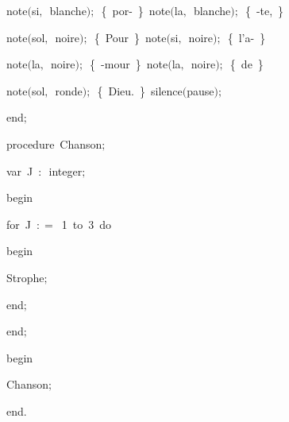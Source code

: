 {\vspace{\neglskip}\mbox{\blc  \blk\blk\idt  note$($si$,$\ blanche$)$$;$\ \cmt  \{\ por-\ \}\idt \ note$($la$,$\ blanche$)$$;$\ \cmt  \{\ -te,\ \}\idt }\par 
\vspace{\neglskip}\mbox{\blc  \blk\blk\idt  note$($sol$,$\ noire$)$$;$\ \cmt  \{\ Pour\ \}\idt \ note$($si$,$\ noire$)$$;$\ \cmt  \{\ l{'}a-\ \}\idt }\par 
\vspace{\neglskip}\mbox{\blc  \blk\blk\idt  note$($la$,$\ noire$)$$;$\ \cmt  \{\ -mour\ \}\idt \ note$($la$,$\ noire$)$$;$\ \cmt  \{\ de\ \}\idt }\par 
\vspace{\neglskip}\mbox{\blc  \blk\blk\idt  note$($sol$,$\ ronde$)$$;$\ \cmt  \{\ Dieu.\ \}\idt \ silence$($pause$)$$;$}\par 
\vspace{\neglskip}\mbox{\blc  \blk\idt  \mcl end\idt $;$}\par 
\medskip

\pagebreak[3] 
\vspace{\neglskip}\mbox{\blc  \blk\idt  \mcl procedure\idt \ Chanson$;$}\par 
\pagebreak[3] 
\vspace{\neglskip}\mbox{\blc  \blk\blk\idt  \mcl var\idt \ J\ $:$\ integer$;$}\par 
\vspace{\neglskip}\mbox{\blc  \blk\idt  \mcl begin\idt }\par 
\pagebreak[3] 
\vspace{\neglskip}\mbox{\blc  \blk\blk\idt  \mcl for\idt \ J\ $:$$=$\ 1\ \mcl to\idt \ 3\ \mcl do\idt }\par 
\vspace{\neglskip}\mbox{\blc  \blk\blk\blk\idt  \mcl begin\idt }\par 
\vspace{\neglskip}\mbox{\blc  \blk\blk\blk\blk\idt  Strophe$;$}\par 
\vspace{\neglskip}\mbox{\blc  \blk\blk\blk\idt  \mcl end\idt $;$}\par 
\vspace{\neglskip}\mbox{\blc  \blk\idt  \mcl end\idt $;$}\par 
\medskip

\vspace{\neglskip}\mbox{\blc  \idt  \mcl begin\idt }\par 
\vspace{\neglskip}\mbox{\blc  \blk\idt  Chanson$;$}\par 
\vspace{\neglskip}\mbox{\blc  \idt  \mcl end\idt $.$}\par 

\medskip }

